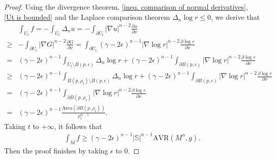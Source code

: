 \documentclass[10pt,a4paper]{amsart}
\begin{document}
\begin{proof}
    Using   the divergence theorem, \cref{ineq. comparison of normal derivatives}, \cref{Ut is bounded} and the Laplace comparison theorem $\Delta_n\log r\leq 0$, we derive that
    \begin{align*}
        &\int_{U_t}f
        =-\int_{U_t}\Delta_n u
        =-\int_{\partial U_t}|\nabla u|^{n-2}\frac{\partial u}{\partial\nu}\\
        \geq& -\int_{\partial U_t}
        |\nabla G|^{n-2}\frac{\partial G}{\partial\nu}
        =\int_{\partial U_t}
        (\gamma-2\epsilon)^{n-1}
        |\nabla \log r|^{n-2}
        \frac{\partial\log r}{\partial\nu}\\
        =&(\gamma-2\epsilon)^{n-1}
        \int_{U_t\setminus B(p,\epsilon)}
        \Delta_n\log r
        +(\gamma-2\epsilon)^{n-1}
        \int_{\partial B(p,\epsilon)}
        |\nabla \log r|^{n-2}
        \frac{\partial\log r}{\partial\nu}\\
        \geq& (\gamma-2\epsilon)^{n-1}
        \int_{B(p,\rho_t)\setminus B(p,\epsilon)}
        \Delta_n\log r
        +(\gamma-2\epsilon)^{n-1}
        \int_{\partial B(p,\epsilon)}
        |\nabla \log r|^{n-2}
        \frac{\partial\log r}{\partial\nu}\\
        =&(\gamma-2\epsilon)^{n-1}
        \int_{\partial B(p,\rho_t)}
        |\nabla \log r|^{n-2}
        \frac{\partial\log r}{\partial\nu}\\
        =&(\gamma-2\epsilon)^{n-1}
        \frac{\mathrm{Area}(\partial B(p, \rho_t))}{\rho_t^{n-1}}.
    \end{align*}
    Taking $t$ to $+\infty$, it follows that
    \begin{align*}
        \int_M f
        \geq (\gamma-2\epsilon)^{n-1}
        |\mathbb{S}|^{n-1}
        \mathrm{AVR}(M^n,g).
    \end{align*}
    Then the proof finishes by taking $\epsilon$ to $0$.
\end{proof}
\end{document}
